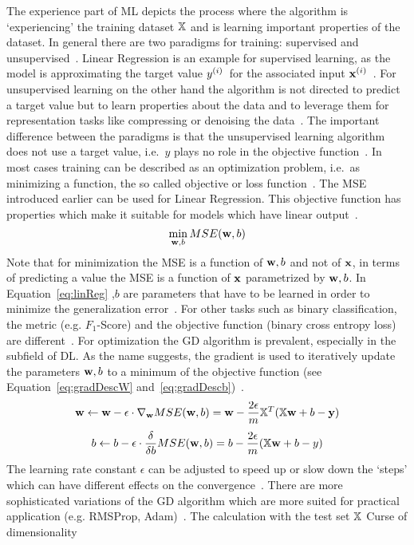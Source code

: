 The experience part of \ac{ML} depicts the process where the algorithm is `experiencing' the training
dataset $\mathbb{X}$ and is learning important properties of the dataset.
In general there are two paradigms for training: supervised and
unsupervised~\citep{goodfellow_deep_2016}.
Linear Regression is an example for supervised learning, as the model is approximating the target
value $y^{(i)}$\ for the associated input $\textbf{x}^{(i)}$~\citep{alzubi_machine_2018,goodfellow_deep_2016}.
For unsupervised learning on the other hand the algorithm is not directed to predict a target
value but to learn properties about the data and to leverage them for representation tasks
like compressing or denoising the data~\citep{goodfellow_deep_2016}.
The important difference between the paradigms is that the unsupervised learning algorithm does
not use a target value, i.e.\ $y$ plays no role in the objective
function~\citep{goodfellow_deep_2016,geron_hands-machine_2017}.
In most cases training can be described as an optimization problem, i.e.\ as minimizing a
function, the so called objective or loss function~\citep{goodfellow_deep_2016}.
The MSE introduced earlier can be used for Linear Regression.
This objective function has properties which make it suitable for models which have linear
output~\citep{goodfellow_deep_2016}.
\begin{equation}\label{eq:mseOpt}
    \min_{\textbf{w},b} MSE(\textbf{w},b)
\end{equation}
Note that for minimization the MSE is a function of $\textbf{w},b$ and not of $\textbf{x}$, in terms of
predicting a value the MSE is a function of $\textbf{x}$ parametrized by $\textbf{w},b$.
In Equation~\ref{eq:linReg} \w,$b$ are parameters that have to be learned in order to minimize
the generalization error~\citep{james_introduction_2013,geron_hands-machine_2017}.
For other tasks such as binary classification, the metric (e.g. $F_1$-Score) and the
objective function (binary cross entropy loss) are different~\citep{geron_hands-machine_2017,
ho_real-world-weight_2020}.
For optimization the \ac{GD} algorithm is prevalent, especially in the subfield of \ac{DL}.
As the name suggests, the gradient is used to iteratively update the parameters $\textbf{w},b$ to a minimum
of the objective function (see Equation~\ref{eq:gradDescW}
and~\ref{eq:gradDescb})~\citep{geron_hands-machine_2017}.
\begin{equation}\label{eq:gradDescW}
    \textbf{w} \leftarrow \textbf{w} - \epsilon \cdot \nabla_{\textbf{w}} MSE(\textbf{w},b) = \textbf{w}-\frac{2\epsilon}{m}\mathbb{X}^T (\mathbb{X}\textbf{w}+b-\textbf{y})
\end{equation}
\begin{equation}\label{eq:gradDescb}
    b \leftarrow b - \epsilon \cdot \frac{\delta}{\delta b} MSE(\textbf{w},b) = b-\frac{2\epsilon}{m}(\mathbb{X}\textbf{w}+b-y)
\end{equation}
The learning rate constant $\epsilon$ can be adjusted to speed up or slow down the `steps' which
can have different effects on the convergence~\citep{goodfellow_deep_2016}.
There are more sophisticated variations of the \ac{GD} algorithm which are more suited for practical
application (e.g. RMSProp, Adam)~\cite{goodfellow_deep_2016}.
The calculation with the test set $\mathbb{X}$
Curse of dimensionality

